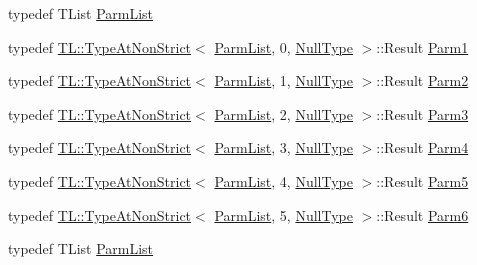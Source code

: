 \begin{DoxyCompactItemize}
\item 
typedef T\+List \mbox{\hyperlink{classUtil_1_1FunctionMap_a6cf0e6766cf6f20642ba61c4994bb477}{Parm\+List}}
\item 
typedef \mbox{\hyperlink{structUtil_1_1TL_1_1TypeAtNonStrict}{T\+L\+::\+Type\+At\+Non\+Strict}}$<$ \mbox{\hyperlink{classUtil_1_1FunctionMap_a6cf0e6766cf6f20642ba61c4994bb477}{Parm\+List}}, 0, \mbox{\hyperlink{classUtil_1_1NullType}{Null\+Type}} $>$\+::Result \mbox{\hyperlink{classUtil_1_1FunctionMap_a7b842c0101fae8075e8b21c90ede63cb}{Parm1}}
\item 
typedef \mbox{\hyperlink{structUtil_1_1TL_1_1TypeAtNonStrict}{T\+L\+::\+Type\+At\+Non\+Strict}}$<$ \mbox{\hyperlink{classUtil_1_1FunctionMap_a6cf0e6766cf6f20642ba61c4994bb477}{Parm\+List}}, 1, \mbox{\hyperlink{classUtil_1_1NullType}{Null\+Type}} $>$\+::Result \mbox{\hyperlink{classUtil_1_1FunctionMap_a46a76423783c6a8dcc4442ffb8cf54a4}{Parm2}}
\item 
typedef \mbox{\hyperlink{structUtil_1_1TL_1_1TypeAtNonStrict}{T\+L\+::\+Type\+At\+Non\+Strict}}$<$ \mbox{\hyperlink{classUtil_1_1FunctionMap_a6cf0e6766cf6f20642ba61c4994bb477}{Parm\+List}}, 2, \mbox{\hyperlink{classUtil_1_1NullType}{Null\+Type}} $>$\+::Result \mbox{\hyperlink{classUtil_1_1FunctionMap_a4578d42cd0723beba85654aa774d0145}{Parm3}}
\item 
typedef \mbox{\hyperlink{structUtil_1_1TL_1_1TypeAtNonStrict}{T\+L\+::\+Type\+At\+Non\+Strict}}$<$ \mbox{\hyperlink{classUtil_1_1FunctionMap_a6cf0e6766cf6f20642ba61c4994bb477}{Parm\+List}}, 3, \mbox{\hyperlink{classUtil_1_1NullType}{Null\+Type}} $>$\+::Result \mbox{\hyperlink{classUtil_1_1FunctionMap_a912703c1f39a6e219b2449183e48fb07}{Parm4}}
\item 
typedef \mbox{\hyperlink{structUtil_1_1TL_1_1TypeAtNonStrict}{T\+L\+::\+Type\+At\+Non\+Strict}}$<$ \mbox{\hyperlink{classUtil_1_1FunctionMap_a6cf0e6766cf6f20642ba61c4994bb477}{Parm\+List}}, 4, \mbox{\hyperlink{classUtil_1_1NullType}{Null\+Type}} $>$\+::Result \mbox{\hyperlink{classUtil_1_1FunctionMap_a993589d5b721f73c7905377e24dbf9f4}{Parm5}}
\item 
typedef \mbox{\hyperlink{structUtil_1_1TL_1_1TypeAtNonStrict}{T\+L\+::\+Type\+At\+Non\+Strict}}$<$ \mbox{\hyperlink{classUtil_1_1FunctionMap_a6cf0e6766cf6f20642ba61c4994bb477}{Parm\+List}}, 5, \mbox{\hyperlink{classUtil_1_1NullType}{Null\+Type}} $>$\+::Result \mbox{\hyperlink{classUtil_1_1FunctionMap_ae121f4a5c3534a888db59d6702a15b40}{Parm6}}
\item 
typedef T\+List \mbox{\hyperlink{classUtil_1_1FunctionMap_a6cf0e6766cf6f20642ba61c4994bb477}{Parm\+List}}

\end{DoxyCompactItemize}
